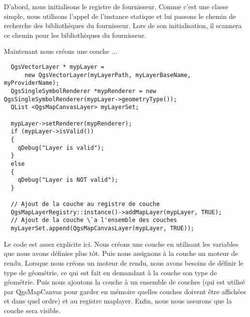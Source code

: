 D'abord, nous initialisons le registre de fournisseur. Comme c'est une classe 
simple, nous utilisons l'appel de l'instance statique et lui passons le chemin 
de recherche des biblioth\`eques du fournisseur. Lors de son initialisation, il 
scannera ce chemin pour les biblioth\`eques du fournisseur.

Maintenant nous cr\'eons une couche ...

\begin{verbatim}
  QgsVectorLayer * mypLayer =
      new QgsVectorLayer(myLayerPath, myLayerBaseName, myProviderName);
  QgsSingleSymbolRenderer *mypRenderer = new
QgsSingleSymbolRenderer(mypLayer->geometryType());
  QList <QgsMapCanvasLayer> myLayerSet;

  mypLayer->setRenderer(mypRenderer);
  if (mypLayer->isValid())
  {
    qDebug("Layer is valid");
  }
  else
  {
    qDebug("Layer is NOT valid");
  }

  // Ajout de la couche au registre de couche
  QgsMapLayerRegistry::instance()->addMapLayer(mypLayer, TRUE);
  // Ajout de la couche \`a l'ensemble des couches
  myLayerSet.append(QgsMapCanvasLayer(mypLayer, TRUE));

\end{verbatim}

Le code est assez explicite ici. Nous cr\'eons une couche en utilisant les variables
que nous avons d\'efinies plus t\^ot. Puis nous assignons \`a la couche un moteur de 
rendu. Lorsque nous cr\'eons un moteur de rendu, nous avons besoins de d\'efinir le 
type de g\'eom\'etrie, ce qui est fait en demandant \`a la couche son type de g\'eom\'etrie.
Puis nous ajoutons la couche \`a un ensemble de couches (qui est utilis\'e par 
QgsMapCanvas pour garder en m\'emoire quelles couches doivent \^etre affich\'ees et 
dans quel ordre) et au registre maplayer. Enfin, nous nous assurons que la couche
 sera visible.


